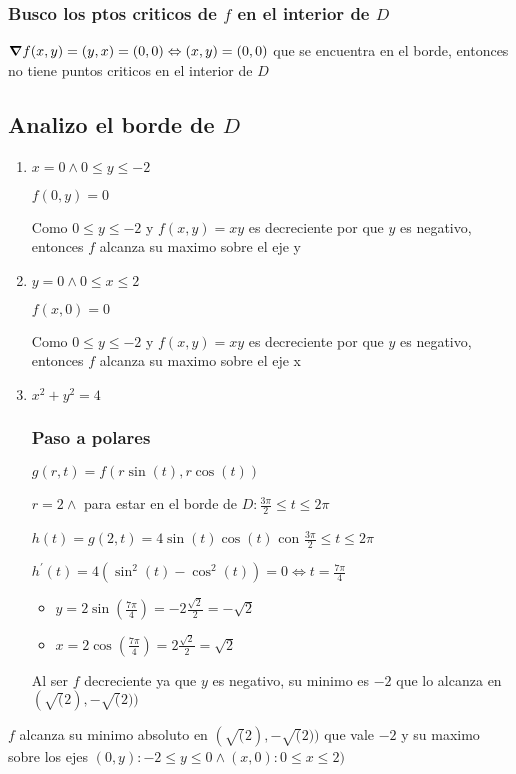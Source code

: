 \documentclass[../parcial.tex]{subfiles}
\begin{document}
    \subsubsection*{Busco los ptos criticos de $f$ en el interior de $D$}

        $\grad f(x,y) = (y,x) = (0,0) \Leftrightarrow (x,y) = (0,0)$ que se encuentra en el borde, entonces no tiene puntos criticos en el interior de $D$

    \subsection*{Analizo el borde de $D$}

    \begin{enumerate}
        \item $x = 0 \wedge 0 \leq y \leq -2$

            $ f(0,y) = 0 $

            Como $ 0 \leq y \leq -2 $ y $f(x,y) = xy$ es decreciente por que $y$ es negativo, entonces $f$ alcanza su maximo sobre el eje y

        \item $y = 0 \wedge 0 \leq x \leq 2$
        
            $ f(x,0) = 0$

            Como $ 0 \leq y \leq -2 $ y $f(x,y) = xy$ es decreciente por que $y$ es negativo, entonces $f$ alcanza su maximo sobre el eje x

        \item $x^2 + y^2 = 4$
        
            \subsubsection*{Paso a polares}
            
            $ g(r, t) = f(r\sin(t), r\cos(t))$

            $ r = 2 \wedge $ para estar en el borde de $D : \frac{3\pi}{2} \leq t \leq 2\pi$

            $ h(t) = g(2,t) = 4\sin(t)\cos(t)$ con $\frac{3\pi}{2} \leq t \leq 2\pi$

            $ h^{\prime}(t) = 4(\sin^2(t) - \cos^2(t)) = 0 \Leftrightarrow t = \frac{7\pi}{4} $

            \begin{itemize}
                \item $y = 2\sin(\frac{7\pi}{4}) = -2 \frac{\sqrt{2}}{2} = -\sqrt{2}$
                
                \item $x = 2\cos(\frac{7\pi}{4}) = 2\frac{\sqrt{2}}{2} = \sqrt{2}$
            \end{itemize}

            Al ser $f$ decreciente ya que $y$ es negativo, su minimo es $-2$ que lo alcanza en $(\sqrt(2), -\sqrt(2))$

    \end{enumerate}

        $f$ alcanza su minimo absoluto en $(\sqrt(2),-\sqrt(2))$ que vale $-2$ y su maximo sobre los ejes $(0,y): -2 \leq y \leq 0 \wedge (x,0): 0\leq x \leq 2)$
\end{document}
